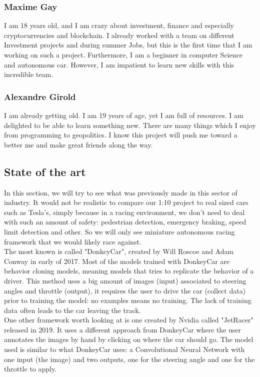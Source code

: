 \documentclass[12pt]{article}
\begin{document}
\subsubsection{Maxime Gay}
I am 18 years old,  and I am crazy about investment, finance and especially cryptocurrencies and blockchain. I already worked with a team on different Investment projects and during summer Jobs, but this is the first time that I am working on such a  project. Furthermore, I am a beginner in computer Science and autonomous car. However, I am impatient to learn new skills with this incredible team. 

\subsubsection{Alexandre Girold}
I am already getting old. I am 19 years of age, yet I am full of resources. I am delighted to be able to learn something new. There are many things which I enjoy from programming to geopolitics. I know this project will push me toward a better me and make great friends along the way. 

\subsection{State of the art}
In this section, we will try to see what was previously made in this sector of industry.
It would not be realistic to compare our 1:10 project to real sized cars such as Tesla's, simply because in a racing environment,
we don't need to deal with such an amount of safety: pedestrian detection, emergency braking, speed limit detection and other.
So we will only see miniature autonomous racing framework that we would likely race against.\\

The most known is called "DonkeyCar", created by Will Roscoe and Adam Conway in early of 2017. Most of the models trained with DonkeyCar are behavior cloning models, meaning models that tries to replicate the behavior of a driver. This method uses a big amount of images (input) associated to steering angles and throttle (output), it requires the user to drive the car (collect data) prior to training the model: no examples means no training. The lack of training data often leads to the car leaving the track.\\

One other framework worth looking at is one created by Nvidia called "JetRacer" released in 2019. It uses a different approach from DonkeyCar where the user annotates the images by hand by clicking on where the car should go. The model used is similar to what DonkeyCar uses: a Convolutional Neural Network with one input (the image) and two outputs, one for the steering angle and one for the throttle to apply. \\
\end{document}
